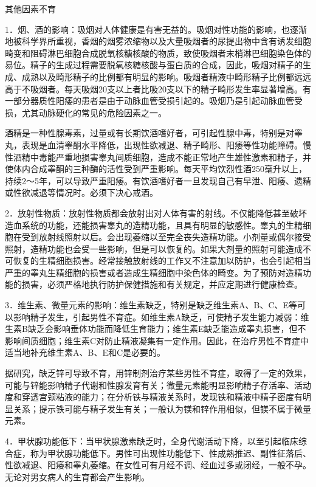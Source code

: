 \documentclass[12pt,UTF8,openany]{ctexbook}
\begin{document}
其他因素不育


1．烟、酒的影响：吸烟对人体健康是有害无益的。吸烟对性功能的影响，也逐渐地被科学界所重视，香烟的烟雾浓缩物以及大量吸烟者的尿提出物中含有诱发细胞畸变和阻碍淋巴细胞合成脱氧核糖核酸的物质，致使吸烟者末梢淋巴细胞染色体的易位。精子的生成过程需要脱氧核糖核酸与蛋白质的合成，因此，吸烟对精子的生成、成熟以及畸形精子的比例都有明显的影响。吸烟者精液中畸形精子比例都远远高于不吸烟者。每天吸烟20支以上者比吸20支以下的精子畸形发生率显著增高。有一部分器质性阳痿的患者是由于动脉血管受损引起的。吸烟乃是引起动脉血管受损，尤其动脉硬化的常见的危险因素之一。

酒精是一种性腺毒素，过量或有长期饮酒嗜好者，可引起性腺中毒，特别是对睾丸，表现是血清睾酮水平降低，出现性欲减退、精子畸形、阳痿等性功能障碍。慢性酒精中毒能严重地损害睾丸间质细胞，造成不能正常地产生雄性激素和精子，并使体内合成睾酮的三种酶的活性受到严重影响。每天平均饮烈性酒250毫升以上，持续2～5年，可以导致严重阳痿。有饮酒嗜好者一旦发现自己有早泄、阳痿、遗精或性欲减退等情况时。必须下决心戒酒。

2．放射性物质：放射性物质都会放射出对人体有害的射线。不仅能降低甚至破坏造血系统的功能，还能损害睾丸的造精功能，且具有明显的敏感性。睾丸的生精细胞在受到放射线照射以后。会出现萎缩以至完全丧失造精功能。小剂量或偶尔接受照射，造精功能也会受一些影响，但是可以恢复的。如果大剂量的照射可能造成不可恢复的生精细胞损害。经常接触放射线的工作又不注意加以防护，也会引起相当严重的睾丸生精细胞的损害或者造成生精细胞中染色体的畸变。为了预防对造精功能的损害，必须严格地执行防护保健措施和有关规定，并应定期进行健康检查。

3．维生素、微量元素的影响：维生素缺乏，特别是缺乏维生素A、B、C、E等可以影响精子发生，引起男性不育症。如维生素A缺乏，可使精子发生能力减弱：维生素B缺乏会影响垂体功能而降低生育能力；维生素E缺乏能造成睾丸损害，但不影响间质细胞；维生素C对防止精液凝集有一定作用。因此，在治疗男性不育症中适当地补充维生素A、B、E和C是必要的。

据研究，缺乏锌可导致不育，用锌制剂治疗某些男性不育症，取得了一定的效果，可能与锌能影响精子代谢和性腺发育有关；微量元素能明显影响精子存活率、活动度和穿透宫颈粘液的能力；在分析铁与精液关系时，发现铁和精液中精子密度有明显关系；提示铁可能与精子发生有关；一般认为镁和锌作用相似，但镁不属于微量元素。

4．甲状腺功能低下：当甲状腺激素缺乏时，全身代谢活动下降，以至引起临床综合症，称为甲状腺功能低下。男性可出现性功能低下、性成熟推迟、副性征落后、性欲减退、阳痿和睾丸萎缩。在女性可有月经不调、经血过多或闭经，一般不孕。无论对男女病人的生育都会产生影响。
\end{document}
